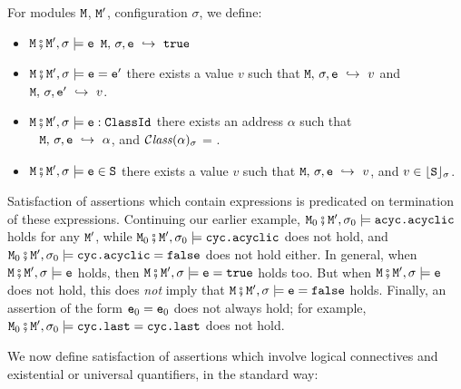  
\begin{definition} For modules $\M$, $\M'$,  configuration $\sigma$,  we define$:$
\label{def:valid:assertion:basic}
\begin{itemize}
\item
$\M\mkpair \M', \sigma \models\SE$ \IFF   $ \M,\,  \sigma, \SE \ \hookrightarrow\   \prg{true}$ 
\item
$\M\mkpair \M', \sigma \models\SE=\SEPrime$ \IFF there exists a value $v$ such that  $\M,\,  \sigma, \SE \ \hookrightarrow\   v$  and $ \M,\,  \sigma, \SEPrime \ \hookrightarrow\   v$.
           \item
$\M\mkpair \M', \sigma \models\SE:\prg{ClassId}$ \IFF there exists an address $\alpha$ such that \\
$\strut ~ $ \hspace{2in} \hfill   
 $ \M,\,  \sigma, \SE \ \hookrightarrow\   \alpha$, and $\ClassOf{\alpha}{\sigma}$ = .
\item
$\M\mkpair \M', \sigma \models \SE\in \prg{S}$ \IFF there exists a value $v$ such that 
 $ \M,\,  \sigma, \SE \ \hookrightarrow\   v$, and $v \in \interp{\prg{S}}{\sigma}$.
\end{itemize}
\end{definition}

Satisfaction of assertions which contain expressions is predicated on termination of these expressions.
Continuing our earlier example,  
$\M_0\mkpair \M', \sigma_0 \models \prg{acyc.acyclic}$ holds for any $\M'$, while $\M_0\mkpair \M', \sigma_0 \models \prg{cyc.acyclic}$
does not hold, and $\M_0\mkpair \M', \sigma_0 \models \prg{cyc.acyclic}=\prg{false}$ does not hold either.
In general, when $\M\mkpair \M', \sigma  \models \prg{e}$ holds,  then $\M\mkpair \M', \sigma  \models \prg{e}=\prg{true}$ holds too.
But when $\M\mkpair \M', \sigma  \models \prg{e}$ does not hold, this does \emph{not} imply that $\M\mkpair \M', \sigma  \models \prg{e}=\prg{false}$ holds.
Finally, an assertion of the form $\e_0=\e_0$ does not always hold; for example,   $\M_0\mkpair \M', \sigma_0 \models \prg{cyc.last}=\prg{cyc.last}$ does not hold.

We now define satisfaction of assertions which involve logical connectives and existential or universal quantifiers, in the standard way:

